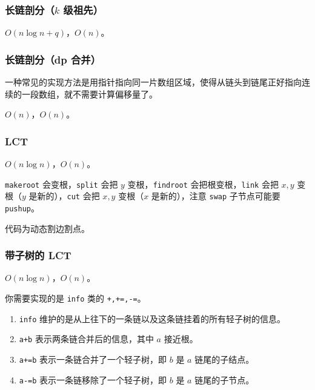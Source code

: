 \documentclass[12pt]{ctexart}
\begin{document}


\subsubsection{长链剖分（$k$ 级祖先）}

$O(n\log n+q)$，$O(n)$。



\subsubsection{长链剖分（dp 合并）}

一种常见的实现方法是用指针指向同一片数组区域，使得从链头到链尾正好指向连续的一段数组，就不需要计算偏移量了。

$O(n)$，$O(n)$。


\subsubsection{LCT}

$O(n\log n)$，$O(n)$。

\verb|makeroot| 会变根，\verb|split| 会把 $y$ 变根，\verb|findroot| 会把根变根，\verb|link| 会把 $x,y$ 变根（$y$ 是新的），\verb|cut| 会把 $x,y$ 变根（$x$ 是新的），注意 \verb|swap| 子节点可能要 \verb|pushup|。

代码为动态割边割点。




\subsubsection{带子树的 LCT}

$O(n\log n)$，$O(n)$。

你需要实现的是 \verb|info| 类的 \verb|+,+=,-=|。

\begin{enumerate}
	\item \verb|info| 维护的是从上往下的一条链以及这条链挂着的所有轻子树的信息。
	\item \verb|a+b| 表示两条链合并后的信息，其中 $a$ 接近根。
	\item \verb|a+=b| 表示一条链合并了一个轻子树，即 $b$ 是 $a$ 链尾的子结点。
	\item \verb|a-=b| 表示一条链移除了一个轻子树，即 $b$ 是 $a$ 链尾的子节点。
\end{enumerate}
\end{document}
